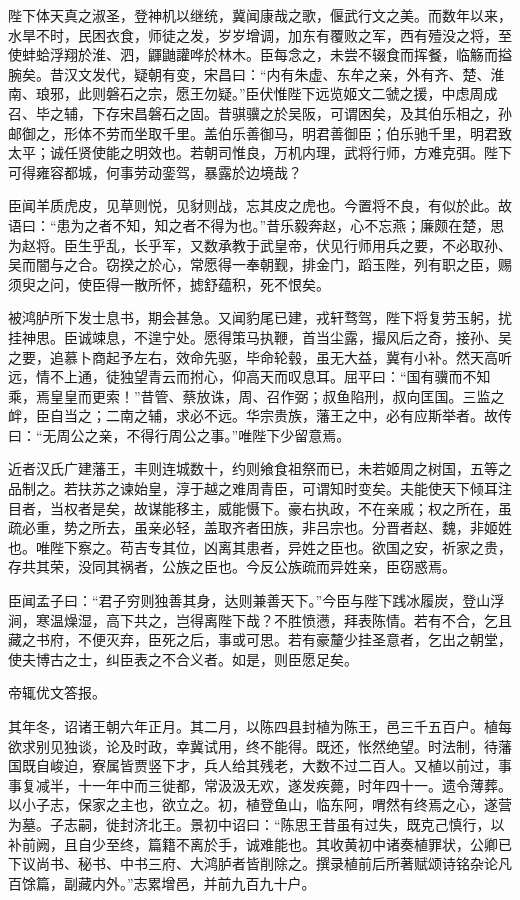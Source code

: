 \documentclass[12pt,UTF8]{ctexbook}
\begin{document}
陛下体天真之淑圣，登神机以继统，冀闻康哉之歌，偃武行文之美。而数年以来，水旱不时，民困衣食，师徒之发，岁岁增调，加东有覆败之军，西有殪没之将，至使蚌蛤浮翔於淮、泗，鼲鼬讙哗於林木。臣每念之，未尝不辍食而挥餐，临觞而搤腕矣。昔汉文发代，疑朝有变，宋昌曰：“内有朱虚、东牟之亲，外有齐、楚、淮南、琅邪，此则磐石之宗，愿王勿疑。”臣伏惟陛下远览姬文二虢之援，中虑周成召、毕之辅，下存宋昌磐石之固。昔骐骥之於吴阪，可谓困矣，及其伯乐相之，孙邮御之，形体不劳而坐取千里。盖伯乐善御马，明君善御臣；伯乐驰千里，明君致太平；诚任贤使能之明效也。若朝司惟良，万机内理，武将行师，方难克弭。陛下可得雍容都城，何事劳动銮驾，暴露於边境哉？

臣闻羊质虎皮，见草则悦，见豺则战，忘其皮之虎也。今置将不良，有似於此。故语曰：“患为之者不知，知之者不得为也。”昔乐毅奔赵，心不忘燕；廉颇在楚，思为赵将。臣生乎乱，长乎军，又数承教于武皇帝，伏见行师用兵之要，不必取孙、吴而闇与之合。窃揆之於心，常愿得一奉朝觐，排金门，蹈玉陛，列有职之臣，赐须臾之问，使臣得一散所怀，摅舒蕴积，死不恨矣。

被鸿胪所下发士息书，期会甚急。又闻豹尾已建，戎轩骛驾，陛下将复劳玉躬，扰挂神思。臣诚竦息，不遑宁处。愿得策马执鞭，首当尘露，撮风后之奇，接孙、吴之要，追慕卜商起予左右，效命先驱，毕命轮毂，虽无大益，冀有小补。然天高听远，情不上通，徒独望青云而拊心，仰高天而叹息耳。屈平曰：“国有骥而不知乘，焉皇皇而更索！”昔管、蔡放诛，周、召作弼；叔鱼陷刑，叔向匡国。三监之衅，臣自当之；二南之辅，求必不远。华宗贵族，藩王之中，必有应斯举者。故传曰：“无周公之亲，不得行周公之事。”唯陛下少留意焉。

近者汉氏广建藩王，丰则连城数十，约则飨食祖祭而已，未若姬周之树国，五等之品制之。若扶苏之谏始皇，淳于越之难周青臣，可谓知时变矣。夫能使天下倾耳注目者，当权者是矣，故谋能移主，威能慑下。豪右执政，不在亲戚；权之所在，虽疏必重，势之所去，虽亲必轻，盖取齐者田族，非吕宗也。分晋者赵、魏，非姬姓也。唯陛下察之。苟吉专其位，凶离其患者，异姓之臣也。欲国之安，祈家之贵，存共其荣，没同其祸者，公族之臣也。今反公族疏而异姓亲，臣窃惑焉。

臣闻孟子曰：“君子穷则独善其身，达则兼善天下。”今臣与陛下践冰履炭，登山浮涧，寒温燥湿，高下共之，岂得离陛下哉？不胜愤懑，拜表陈情。若有不合，乞且藏之书府，不便灭弃，臣死之后，事或可思。若有豪釐少挂圣意者，乞出之朝堂，使夫博古之士，纠臣表之不合义者。如是，则臣愿足矣。

帝辄优文答报。

其年冬，诏诸王朝六年正月。其二月，以陈四县封植为陈王，邑三千五百户。植每欲求别见独谈，论及时政，幸冀试用，终不能得。既还，怅然绝望。时法制，待藩国既自峻迫，寮属皆贾竖下才，兵人给其残老，大数不过二百人。又植以前过，事事复减半，十一年中而三徙都，常汲汲无欢，遂发疾薨，时年四十一。遗令薄葬。以小子志，保家之主也，欲立之。初，植登鱼山，临东阿，喟然有终焉之心，遂营为墓。子志嗣，徙封济北王。景初中诏曰：“陈思王昔虽有过失，既克己慎行，以补前阙，且自少至终，篇籍不离於手，诚难能也。其收黄初中诸奏植罪状，公卿已下议尚书、秘书、中书三府、大鸿胪者皆削除之。撰录植前后所著赋颂诗铭杂论凡百馀篇，副藏内外。”志累增邑，并前九百九十户。
\end{document}
